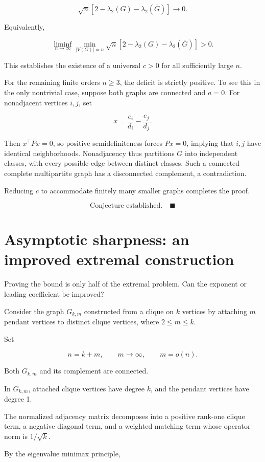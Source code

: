 \documentclass[11pt]{article}
\begin{document}
\[
\sqrt n\left[
2-\lambda_2(G)-\lambda_2(\overline G)
\right]\longrightarrow0.
\]

Equivalently,

\[
\liminf_{n\to\infty}
\min_{|V(G)|=n}
\sqrt n\left[
2-\lambda_2(G)-\lambda_2(\overline G)
\right]>0.
\]

This establishes the existence of a universal \(c>0\) for all sufficiently large \(n\).

For the remaining finite orders \(n\geq3\), the deficit is strictly positive. To see this in the only nontrivial case, suppose both graphs are connected and \(a=0\). For nonadjacent vertices \(i,j\), set

\[
x=\frac{e_i}{d_i}-\frac{e_j}{d_j}.
\]

Then \(x^\top Px=0\), so positive semidefiniteness forces \(Px=0\), implying that \(i,j\) have identical neighborhoods. Nonadjacency thus partitions \(G\) into independent classes, with every possible edge between distinct classes. Such a connected complete multipartite graph has a disconnected complement, a contradiction.

Reducing \(c\) to accommodate finitely many smaller graphs completes the proof.

\[
\boxed{\text{Conjecture established.}\quad\blacksquare}
\]

\section{Asymptotic sharpness: an improved extremal construction}

Proving the bound is only half of the extremal problem. Can the exponent or leading coefficient be improved?

Consider the graph \(G_{k,m}\) constructed from a clique on \(k\) vertices by attaching \(m\) pendant vertices to distinct clique vertices, where \(2\leq m\leq k\).

Set

\[
n=k+m,\qquad m\to\infty,\qquad m=o(n).
\]

Both \(G_{k,m}\) and its complement are connected.

In \(G_{k,m}\), attached clique vertices have degree \(k\), and the pendant vertices have degree 1.

The normalized adjacency matrix decomposes into a positive rank-one clique term, a negative diagonal term, and a weighted matching term whose operator norm is \(1/\sqrt{k}\).

By the eigenvalue minimax principle,
\end{document}
